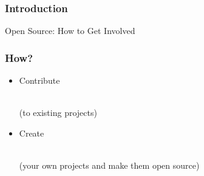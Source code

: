 \documentclass{beamer}
\begin{document}
\begin{frame}
  \frametitle{Introduction}
 \begin{center}\begin{LARGE}Open Source: How to Get Involved\end{LARGE}\end{center}
\end{frame}

\begin{frame}
  \frametitle{How?}
  \begin{itemize}
    \setlength{\itemsep}{2em}
  \item \begin{LARGE} \textcolor<2>{beamer@myblue}{Contribute} \end{LARGE} \\ \textcolor<2>{beamer@myblue}{(to existing projects)}
  \item \begin{LARGE} \textcolor<2>{beamer@mygrey}{Create} \end{LARGE} \\ \textcolor<2>{beamer@mygrey}{(your own projects and make them open source)}
  \end{itemize}
\end{frame}
\end{document}
